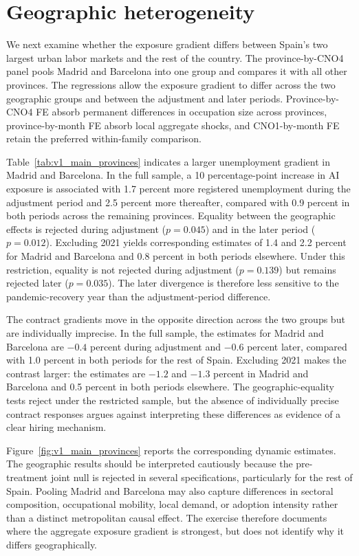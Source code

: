 \documentclass[11pt]{article}
\newcommand{\figdir}{uploads/figuresNtables}
\begin{document}
\section{Geographic heterogeneity}
\label{sec:v1_geographic}

We next examine whether the exposure gradient differs between Spain's two largest urban labor markets and the rest of the country. The province-by-CNO4 panel pools Madrid and Barcelona into one group and compares it with all other provinces. The regressions allow the exposure gradient to differ across the two geographic groups and between the adjustment and later periods. Province-by-CNO4 FE absorb permanent differences in occupation size across provinces, province-by-month FE absorb local aggregate shocks, and CNO1-by-month FE retain the preferred within-family comparison.



Table~\ref{tab:v1_main_provinces} indicates a larger unemployment gradient in Madrid and Barcelona. In the full sample, a 10 percentage-point increase in AI exposure is associated with 1.7 percent more registered unemployment during the adjustment period and 2.5 percent more thereafter, compared with 0.9 percent in both periods across the remaining provinces. Equality between the geographic effects is rejected during adjustment (\(p=0.045\)) and in the later period (\(p=0.012\)). Excluding 2021 yields corresponding estimates of 1.4 and 2.2 percent for Madrid and Barcelona and 0.8 percent in both periods elsewhere. Under this restriction, equality is not rejected during adjustment (\(p=0.139\)) but remains rejected later (\(p=0.035\)). The later divergence is therefore less sensitive to the pandemic-recovery year than the adjustment-period difference.

The contract gradients move in the opposite direction across the two groups but are individually imprecise. In the full sample, the estimates for Madrid and Barcelona are \(-0.4\) percent during adjustment and \(-0.6\) percent later, compared with 1.0 percent in both periods for the rest of Spain. Excluding 2021 makes the contrast larger: the estimates are \(-1.2\) and \(-1.3\) percent in Madrid and Barcelona and 0.5 percent in both periods elsewhere. The geographic-equality tests reject under the restricted sample, but the absence of individually precise contract responses argues against interpreting these differences as evidence of a clear hiring mechanism.

Figure~\ref{fig:v1_main_provinces} reports the corresponding dynamic estimates. The geographic results should be interpreted cautiously because the pre-treatment joint null is rejected in several specifications, particularly for the rest of Spain. Pooling Madrid and Barcelona may also capture differences in sectoral composition, occupational mobility, local demand, or adoption intensity rather than a distinct metropolitan causal effect. The exercise therefore documents where the aggregate exposure gradient is strongest, but does not identify why it differs geographically.
\end{document}
